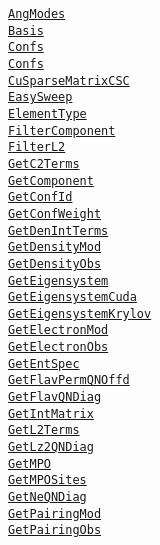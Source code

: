 \documentclass{timesjhep}
\begin{document}
\begin{multicols}{3}
    \noindent
    \href{}{\lstinline|AngModes|}\\
    \href{}{\lstinline|Basis|}\\
    \href{}{\lstinline|Confs|}\\
    \href{}{\lstinline|Confs|}\\
    \href{}{\lstinline|CuSparseMatrixCSC|}\\
    \href{}{\lstinline|EasySweep|}\\
    \href{}{\lstinline|ElementType|}\\
    \href{}{\lstinline|FilterComponent|}\\
    \href{}{\lstinline|FilterL2|}\\
    \href{}{\lstinline|GetC2Terms|}\\
    \href{}{\lstinline|GetComponent|}\\
    \href{}{\lstinline|GetConfId|}\\
    \href{}{\lstinline|GetConfWeight|}\\
    \href{}{\lstinline|GetDenIntTerms|}\\
    \href{}{\lstinline|GetDensityMod|}\\
    \href{}{\lstinline|GetDensityObs|}\\
    \href{}{\lstinline|GetEigensystem|}\\
    \href{}{\lstinline|GetEigensystemCuda|}\\
    \href{}{\lstinline|GetEigensystemKrylov|}\\
    \href{}{\lstinline|GetElectronMod|}\\
    \href{}{\lstinline|GetElectronObs|}\\
    \href{}{\lstinline|GetEntSpec|}\\
    \href{}{\lstinline|GetFlavPermQNOffd|}\\
    \href{}{\lstinline|GetFlavQNDiag|}\\
    \href{}{\lstinline|GetIntMatrix|}\\
    \href{}{\lstinline|GetL2Terms|}\\
    \href{}{\lstinline|GetLz2QNDiag|}\\
    \href{}{\lstinline|GetMPO|}\\
    \href{}{\lstinline|GetMPOSites|}\\
    \href{}{\lstinline|GetNeQNDiag|}\\
    \href{}{\lstinline|GetPairingMod|}\\
    \href{}{\lstinline|GetPairingObs|}\\

\end{multicols}
\end{document}
